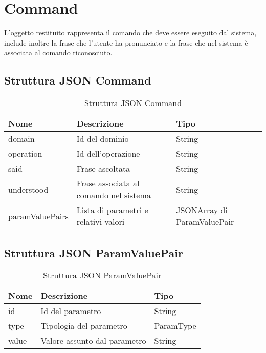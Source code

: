 \documentclass[twoside]{supsistudent}
\begin{document}
\section{Command}
L'oggetto restituito rappresenta il comando che deve essere eseguito dal sistema, include inoltre la frase che l'utente ha pronunciato e la frase che nel sistema è associata al comando riconosciuto.
\subsection{Struttura JSON Command}
\begin{table}[H]
\centering
\caption{Struttura JSON Command}
\label{Struttura JSON Command}
\begin{tabular}{|l|l|l|}
\hline
Nome            & Descrizione                            & Tipo                        \\ \hline
domain          & Id del dominio                         & String                      \\ \hline
operation       & Id dell'operazione                     & String                      \\ \hline
said            & Frase ascoltata                        & String                      \\ \hline
understood      & Frase associata al comando nel sistema & String                      \\ \hline
paramValuePairs & Lista di parametri e relativi valori   & JSONArray di ParamValuePair \\ \hline
\end{tabular}
\end{table}
\subsection{Struttura JSON ParamValuePair}
\begin{table}[H]
\centering
\caption{Struttura JSON ParamValuePair}
\label{Struttura JSON ParamValuePair}
\begin{tabular}{|l|l|l|}
\hline
Nome  & Descrizione                  & Tipo      \\ \hline
id    & Id del parametro             & String    \\ \hline
type  & Tipologia del parametro      & ParamType \\ \hline
value & Valore assunto dal parametro & String    \\ \hline
\end{tabular}
\end{table}
\end{document}
